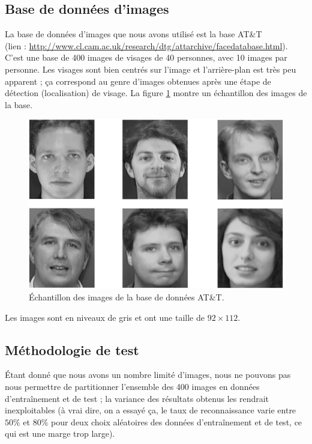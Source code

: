 \subsection{Base de données d'images}
La base de données d'images que nous avons utilisé est la base AT\&T\\
(lien : \url{http://www.cl.cam.ac.uk/research/dtg/attarchive/facedatabase.html}).
C'est une base de 400 images de visages de 40 personnes, avec 10 images 
par personne. Les visages sont bien centrés sur l'image et l'arrière-plan
est très peu apparent ; ça correspond au genre d'images obtenues après une étape de 
détection (localisation) de visage. La figure \ref{fig:implementation:bdd_exemple} montre
un échantillon des images de la base.
\begin{figure}[H]
    \centering
    \includegraphics[scale=0.4]{images/bdd_exemple}
    \caption{Échantillon des images de la base de données AT\&T.}
    \label{fig:implementation:bdd_exemple}
\end{figure}
Les images sont en niveaux de gris et ont une taille de $92 \times 112$.


\subsection{Méthodologie de test}
Étant donné que nous avons un nombre limité d'images, nous ne pouvons pas
nous permettre de partitionner l'ensemble des 400 images en données 
d’entraînement et de test ; la variance des résultats obtenus les rendrait
inexploitables (à vrai dire, on a essayé ça, le taux de reconnaissance
varie entre $50\%$ et $80\%$ pour deux choix aléatoires des données d'entraînement
et de test, ce qui est une marge trop large).


